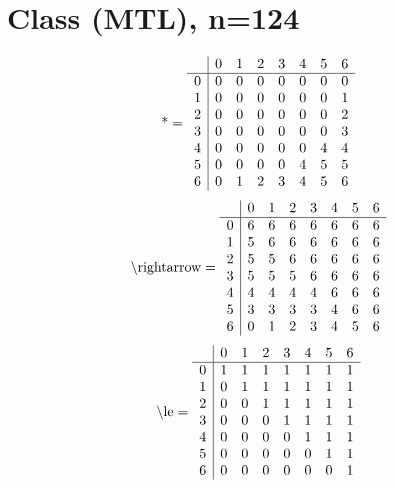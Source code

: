 \documentclass[11pt]{article}
\begin{document}
\section{Class (MTL), n=124}
\[\text{*} = 
\begin{array}{r | r r r r r r r}
 & 0 & 1 & 2 & 3 & 4 & 5 & 6 \\ \hline
0 & 0 & 0 & 0 & 0 & 0 & 0 & 0 \\
1 & 0 & 0 & 0 & 0 & 0 & 0 & 1 \\
2 & 0 & 0 & 0 & 0 & 0 & 0 & 2 \\
3 & 0 & 0 & 0 & 0 & 0 & 0 & 3 \\
4 & 0 & 0 & 0 & 0 & 0 & 4 & 4 \\
5 & 0 & 0 & 0 & 0 & 4 & 5 & 5 \\
6 & 0 & 1 & 2 & 3 & 4 & 5 & 6 \\
\end{array}
\]
\[\text{\textbackslash rightarrow} = 
\begin{array}{r | r r r r r r r}
 & 0 & 1 & 2 & 3 & 4 & 5 & 6 \\ \hline
0 & 6 & 6 & 6 & 6 & 6 & 6 & 6 \\
1 & 5 & 6 & 6 & 6 & 6 & 6 & 6 \\
2 & 5 & 5 & 6 & 6 & 6 & 6 & 6 \\
3 & 5 & 5 & 5 & 6 & 6 & 6 & 6 \\
4 & 4 & 4 & 4 & 4 & 6 & 6 & 6 \\
5 & 3 & 3 & 3 & 3 & 4 & 6 & 6 \\
6 & 0 & 1 & 2 & 3 & 4 & 5 & 6 \\
\end{array}
\]
\[\text{\textbackslash le} = 
\begin{array}{r | r r r r r r r}
 & 0 & 1 & 2 & 3 & 4 & 5 & 6 \\ \hline
0 & 1 & 1 & 1 & 1 & 1 & 1 & 1 \\
1 & 0 & 1 & 1 & 1 & 1 & 1 & 1 \\
2 & 0 & 0 & 1 & 1 & 1 & 1 & 1 \\
3 & 0 & 0 & 0 & 1 & 1 & 1 & 1 \\
4 & 0 & 0 & 0 & 0 & 1 & 1 & 1 \\
5 & 0 & 0 & 0 & 0 & 0 & 1 & 1 \\
6 & 0 & 0 & 0 & 0 & 0 & 0 & 1 \\
\end{array}
\]
\end{document}
